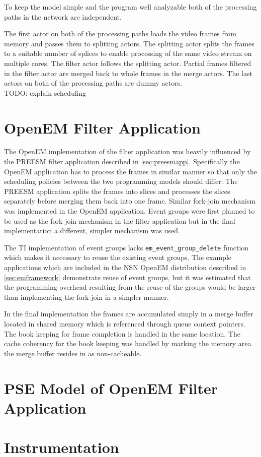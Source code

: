 To keep the model simple and the program well analyzable both of the processing
paths in the network are independent.

The first actor on both of the processing paths loads the video frames from
memory and passes them to splitting actors. The splitting actor splits the
frames to a suitable number of splices to enable processing of the same video
stream on multiple cores. The filter actor follows the splitting actor. Partial
frames filtered in the filter actor are merged back to whole frames in the merge
actors. The last actors on both of the processing paths are dummy actors.\\

TODO: explain scheduling

\section{OpenEM Filter Application}
The OpenEM implementation of the filter application was heavily influenced by
the PREESM filter application described in \ref{sec:preesmapp}. Specifically the
OpenEM application has to process the frames in similar manner so that only the
scheduling policies between the two programming models should differ. The PREESM
application splits the frames into slices and processes the slices separately
before merging them back into one frame. Similar fork-join mechanism was
implemented in the OpenEM application. Event groups were first planned to be
used as the fork-join mechanism in the filter application but in the final
implementation a different, simpler mechanism was used.

The TI implementation of event groups lacks \texttt{em\_event\_group\_delete}
function which makes it necessary to reuse the existing event groups. The
example applications which are included in the NSN OpenEM distribution
described in \ref{sec:emframework} demonstrate reuse of event groups, but it
was estimated that the programming overhead resulting from the reuse of the
groups would be larger than implementing the fork-join in a simpler manner.

In the final implementation the frames are accumulated simply in a merge buffer
located in shared memory which is referenced through queue context pointers. The
book keeping for frame completion is handled in the same location. The cache
coherency for the book keeping was handled by marking the memory area the merge
buffer resides in as non-cacheable.

\section{PSE Model of OpenEM Filter Application}
\section{Instrumentation}
